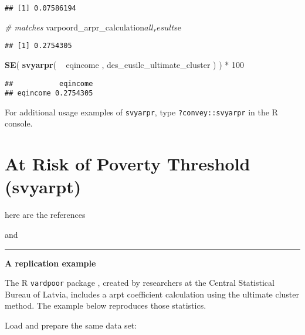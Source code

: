 \documentclass[]{book}
\newenvironment{Shaded}{\begin{snugshade}}{\end{snugshade}}
\newcommand{\KeywordTok}[1]{\textcolor[rgb]{0.13,0.29,0.53}{\textbf{{#1}}}}
\newcommand{\DecValTok}[1]{\textcolor[rgb]{0.00,0.00,0.81}{{#1}}}
\newcommand{\StringTok}[1]{\textcolor[rgb]{0.31,0.60,0.02}{{#1}}}
\newcommand{\CommentTok}[1]{\textcolor[rgb]{0.56,0.35,0.01}{\textit{{#1}}}}
\newcommand{\NormalTok}[1]{{#1}}
\theoremstyle{definition}
\theoremstyle{definition}
\theoremstyle{remark}
\begin{document}
\begin{verbatim}
## [1] 0.07586194
\end{verbatim}

\begin{Shaded}
\begin{Highlighting}[]
\CommentTok{# matches}
\NormalTok{varpoord_arpr_calculation$all_result$se}
\end{Highlighting}
\end{Shaded}

\begin{verbatim}
## [1] 0.2754305
\end{verbatim}

\begin{Shaded}
\begin{Highlighting}[]
\KeywordTok{SE}\NormalTok{( }\KeywordTok{svyarpr}\NormalTok{( ~}\StringTok{ }\NormalTok{eqincome , des_eusilc_ultimate_cluster ) ) *}\StringTok{ }\DecValTok{100}
\end{Highlighting}
\end{Shaded}

\begin{verbatim}
##           eqincome
## eqincome 0.2754305
\end{verbatim}

For additional usage examples of \texttt{svyarpr}, type
\texttt{?convey::svyarpr} in the R console.

\section{At Risk of Poverty Threshold
(svyarpt)}\label{at-risk-of-poverty-threshold-svyarpt}

here are the references

\citep{osier2009} and \citep{deville1999}

\begin{center}\rule{0.5\linewidth}{\linethickness}\end{center}

\textbf{A replication example}

The R \texttt{vardpoor} package \citep{vardpoor}, created by researchers
at the Central Statistical Bureau of Latvia, includes a arpt coefficient
calculation using the ultimate cluster method. The example below
reproduces those statistics.

Load and prepare the same data set:
\end{document}
